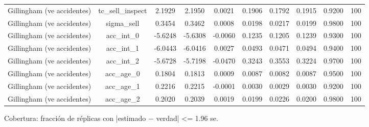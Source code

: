 \begin{table}[htbp]
\begin{tabular}{lccccccccc}
Gillingham (ve accidentes) & tc\_sell\_inspect & 2.1929 & 2.1950 & 0.0021 & 0.1906 & 0.1792 & 0.1915 & 0.9200 & 100 \\
Gillingham (ve accidentes) & sigma\_sell & 0.3454 & 0.3462 & 0.0008 & 0.0198 & 0.0217 & 0.0199 & 0.9800 & 100 \\
Gillingham (ve accidentes) & acc\_int\_0 & -5.6248 & -5.6308 & -0.0060 & 0.1235 & 0.1205 & 0.1239 & 0.9300 & 100 \\
Gillingham (ve accidentes) & acc\_int\_1 & -6.0443 & -6.0416 & 0.0027 & 0.0493 & 0.0471 & 0.0494 & 0.9400 & 100 \\
Gillingham (ve accidentes) & acc\_int\_2 & -5.6728 & -5.7198 & -0.0470 & 0.3243 & 0.3553 & 0.3224 & 0.9700 & 100 \\
Gillingham (ve accidentes) & acc\_age\_0 & 0.1804 & 0.1813 & 0.0009 & 0.0087 & 0.0082 & 0.0087 & 0.9500 & 100 \\
Gillingham (ve accidentes) & acc\_age\_1 & 0.2216 & 0.2215 & -0.0001 & 0.0030 & 0.0029 & 0.0030 & 0.9200 & 100 \\
Gillingham (ve accidentes) & acc\_age\_2 & 0.2020 & 0.2039 & 0.0019 & 0.0199 & 0.0226 & 0.0200 & 0.9800 & 100 \\
\bottomrule
\end{tabular}
\par\smallskip\footnotesize Cobertura: fracción de réplicas con |estimado $-$ verdad| <= 1.96 se.
\end{table}

